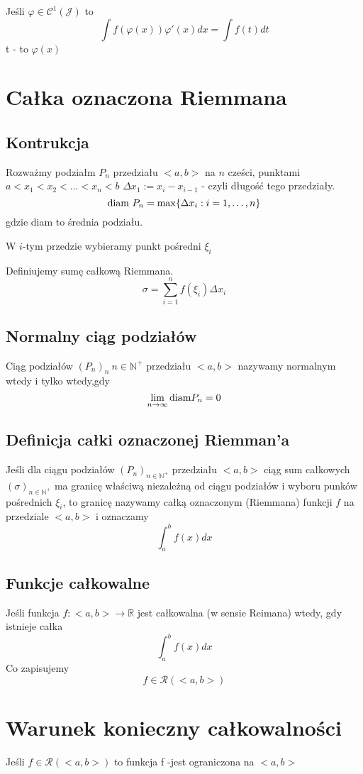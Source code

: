 \documentclass[11pt]{article}
\begin{document}
Jeśli $\varphi \in \mathcal{C}^1(\mathcal{J})$ to 
$$ \int f(\varphi(x))\varphi'(x)dx = \int f(t)dt $$
t - to $\varphi(x)$

\section{Całka oznaczona Riemmana}
\subsection{Kontrukcja}
Rozważmy podziałm $P_n$ przedziału $<a,b>$ na $n$ cześci, punktami $a < x_1 < x_2 < \ldots <x_n < b$
$ \Delta x_1 := x_i - x_{i-1}$ - czyli długość tego przedziały. 
$$ \hbox{diam }{P_n} = \max \{ \Delta x_i : i = 1,\ldots,n \} $$ gdzie diam to średnia podziału.

W $i$-tym przedzie wybieramy punkt pośredni $ \xi_i $

Definiujemy sumę całkową Riemmana. $$ \sigma = \sum_{i= 1}^n{f(\xi_i)\Delta x_i}$$

\subsection{Normalny ciąg podziałów}
Ciąg podziałów $(P_n)_n\ n \in \mathbb{N}^+$ przedziału $<a,b>$ nazywamy normalnym wtedy i tylko wtedy,gdy $$ \lim_{n \to \infty}{\hbox{diam} P_n} = 0$$
\subsection{Definicja całki oznaczonej Riemman'a}
Jeśli dla ciągu podziałów $(P_n)_{n \in \mathbb{N}^+}$ przedziału $<a,b>$ ciąg sum całkowych $ (\sigma)_{n \in \mathbb{N}^+}$ ma granicę właściwą niezależną od ciągu podziałów i wyboru punków pośrednich $\xi_i$, to granicę nazywamy całką oznaczonym (Riemmana) funkcji $f$ na przedziale $<a,b>$ i oznaczamy 
$$ \int_a^b f(x)dx $$

\subsection{Funkcje całkowalne}
Jeśli funkcja $f : <a,b> \to \mathbb{R}$ jest całkowalna (w sensie Reimana) wtedy, gdy istnieje całka
$$ \int_a^b f(x)dx $$
Co zapisujemy 
$$f \in \mathcal{R}(<a,b>)$$ 

\section{Warunek konieczny całkowalności}
Jeśli $f \in \mathcal{R}(<a,b>)$ to funkcja f -jest ograniczona na $<a,b>$ 
\end{document}

